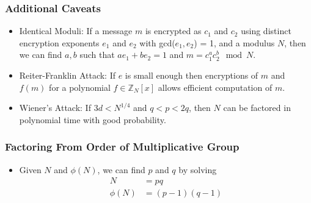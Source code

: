 \documentclass[a4paper]{scrartcl}
\begin{document}
\subsubsection*{Additional Caveats}

\begin{itemize}
\item Identical Moduli: If a message $m$ is encrypted as $c_1$ and $c_2$ using distinct encryption exponents $e_1$ and $e_2$ with gcd($e_1,e_2$) = 1, and a modulus $N$, then we can find $a,b$ such that $ae_1 + be_2 = 1$ and $m = c_1^ac_2^b \mod N$.
\item Reiter-Franklin Attack: If $e$ is small enough then encryptions of $m$ and $f(m)$ for a polynomial $f \in \mathbb{Z}_N[x]$ allows efficient computation of $m$.
\item Wiener's Attack: If $3d < N^{1/4}$ and $q<p<2q$, then $N$ can be factored in polynomial time with good probability. 
\end{itemize}

\subsubsection*{Factoring From Order of Multiplicative Group}

\begin{itemize}
\item Given $N$ and $\phi(N)$, we can find $p$ and $q$ by solving
\begin{align*}
N &= pq \\
\phi(N) &= (p-1)(q-1)
\end{align*}
\end{itemize}
\end{document}
